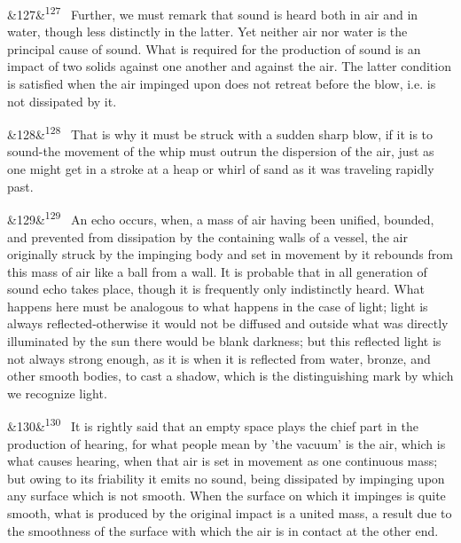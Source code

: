 \documentclass[12pt]{article}
\newcommand{\para}[1][]{\par\noindent\ifx&#1&\else\textsuperscript{\footnotesize #1}~\fi}
\begin{document}
\para[127] Further, we must remark that sound is heard both in air and in water, though less distinctly in the latter. Yet neither air nor water is the principal cause of sound. What is required for the production of sound is an impact of two solids against one another and against the air. The latter condition is satisfied when the air impinged upon does not retreat before the blow, i.e. is not dissipated by it.

\para[128] That is why it must be struck with a sudden sharp blow, if it is to sound-the movement of the whip must outrun the dispersion of the air, just as one might get in a stroke at a heap or whirl of sand as it was traveling rapidly past.

\para[129] An echo occurs, when, a mass of air having been unified, bounded, and prevented from dissipation by the containing walls of a vessel, the air originally struck by the impinging body and set in movement by it rebounds from this mass of air like a ball from a wall. It is probable that in all generation of sound echo takes place, though it is frequently only indistinctly heard. What happens here must be analogous to what happens in the case of light; light is always reflected-otherwise it would not be diffused and outside what was directly illuminated by the sun there would be blank darkness; but this reflected light is not always strong enough, as it is when it is reflected from water, bronze, and other smooth bodies, to cast a shadow, which is the distinguishing mark by which we recognize light.

\para[130] It is rightly said that an empty space plays the chief part in the production of hearing, for what people mean by 'the vacuum' is the air, which is what causes hearing, when that air is set in movement as one continuous mass; but owing to its friability it emits no sound, being dissipated by impinging upon any surface which is not smooth. When the surface on which it impinges is quite smooth, what is produced by the original impact is a united mass, a result due to the smoothness of the surface with which the air is in contact at the other end.
\end{document}

